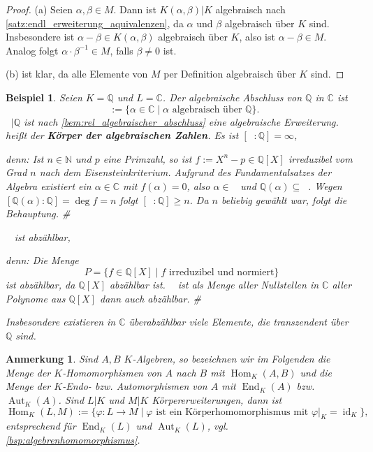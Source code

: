 \documentclass[a4paper, twoside, 11pt, ngerman]{report}
\newcommand{\CC}{\mathds C}
\newcommand{\NN}{\mathds N}
\newcommand{\QQ}{\mathds Q}
\DeclareMathOperator{\alg}{alg}
\DeclareMathOperator{\Aut}{Aut}
\DeclareMathOperator{\End}{End}
\DeclareMathOperator{\Hom}{Hom}
\DeclareMathOperator{\QQalg}{\QQ^{\alg}}
\theoremstyle{definistyle}
\newtheorem{anm}[satz]{Anmerkung}
\newtheorem{bsp}[satz]{Beispiel}
\theoremstyle{remark}
\newenvironment{denn}%
  {\par\textit{denn:}}%
  {\hfill\#\par}
\newcommand{\defn}[1]{\textit{\bfseries #1}}
\begin{document}
\begin{proof}
(a) Seien $\alpha, \beta \in M$. Dann ist $K(\alpha, \beta)|K$ algebraisch nach \ref{satz:endl_erweiterung_aquivalenzen}, da $\alpha$ und $\beta$ algebraisch über $K$ sind. Insbesondere ist $\alpha - \beta \in K(\alpha, \beta)$ algebraisch über $K$, also ist $\alpha - \beta \in M$. Analog folgt $\alpha \cdot \beta^{-1} \in M$, falls $\beta \neq 0$ ist.

(b) ist klar, da alle Elemente von $M$ per Definition algebraisch über $K$ sind.
\end{proof}

\begin{bsp}\label{bsp:algebraischer_abschluss}
Seien $K = \QQ$ und $L = \CC$. Der algebraische Abschluss von $\QQ$ in $\CC$ ist
\[
\QQalg := \{\alpha \in \CC \mid \alpha \text{ algebraisch über } \QQ\}.
\]
$\QQalg|\QQ$ ist nach \ref{bem:rel_algebraischer_abschluss} eine algebraische Erweiterung.
$\QQalg$ heißt der \defn{Körper der algebraischen Zahlen}.
Es ist $[\QQalg : \QQ] = \infty$, 
\begin{denn}
Ist $n\in\NN$ und $p$ eine Primzahl, so ist $f:= X^n - p \in \QQ[X]$ irreduzibel vom Grad $n$ nach dem Eisensteinkriterium. Aufgrund des Fundamentalsatzes der Algebra existiert ein $\alpha \in \CC$ mit $f(\alpha) = 0$, also $\alpha \in \QQalg$
und $\QQ(\alpha)\subseteq\QQalg$. Wegen $[\QQ(\alpha) : \QQ] = \deg f=n$ folgt $[\QQalg : \QQ] \geq n$. Da $n$ beliebig gewählt war, folgt die Behauptung.
\end{denn}
$\QQalg$ ist abzählbar, 
\begin{denn} 
Die Menge
\[
P = \{f \in \QQ[X] \mid f \text{ irreduzibel und normiert}\}
\]
ist abzählbar, da $\QQ[X]$ abzählbar ist. $\QQalg$ ist als Menge aller Nullstellen in $\CC$ aller Polynome aus $\QQ[X]$
dann auch abzählbar.
\end{denn}
Insbesondere existieren in $\CC$ überabzählbar viele Elemente, die transzendent über $\QQ$ sind.
\end{bsp}

\begin{anm}
Sind $A,B$ $K$-Algebren, so bezeichnen wir im Folgenden die Menge der $K$-Homomorphismen von $A$ nach $B$ mit $\Hom_K(A, B)$ und die Menge der $K$-Endo- bzw. Automorphismen von $A$ mit $\End_K(A)$ bzw. $\Aut_K(A)$. Sind $L|K$ und $M|K$ Körpererweiterungen, dann ist
\[
\Hom_K(L, M) := \{\varphi \colon L \to M \mid \varphi \text{ ist ein Körperhomomorphismus mit } \varphi|_K = \operatorname{id}_K\},
\]
entsprechend für $\End_K(L)$ und $\Aut_K(L)$, vgl. \ref{bsp:algebrenhomomorphismus}.
\end{anm}
\end{document}
